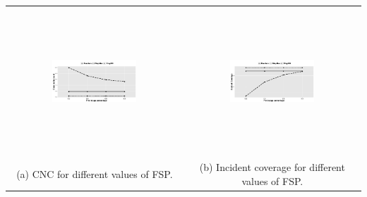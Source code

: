 \documentclass{acm_proc_article-sp}
\begin{document}
\begin{table}[!tbh]
\centering
\begin{tabular}{cc}
   \includegraphics[width=0.5\textwidth, height=5.5cm]{figuresPng/LT-closePeople.png} &  \includegraphics[width=0.5\textwidth, height=5.5cm]{figuresPng/LT-incidCov.png}\\
   (a) CNC for different values of FSP. & (b) Incident coverage for different values of FSP.\\
\end{tabular}
\label{fig:longTailResults}
\end{table}
\end{document}
